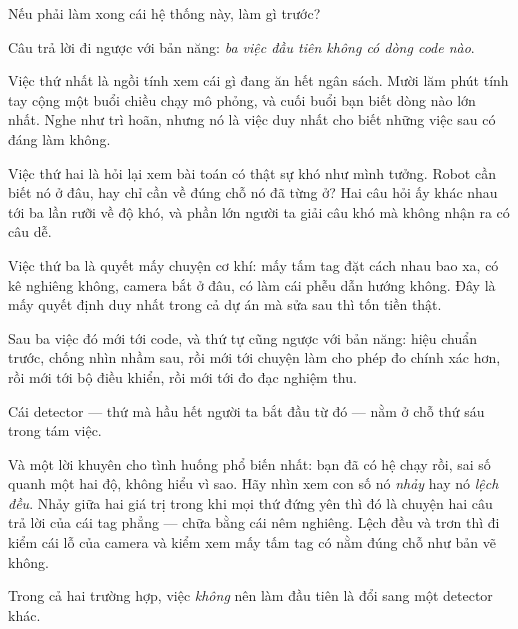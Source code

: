 \documentclass[../../marker.tex]{subfiles}
\begin{document}
\begin{dongian}
Nếu phải làm xong cái hệ thống này, làm gì trước?

Câu trả lời đi ngược với bản năng: \emph{ba việc đầu tiên không có dòng code nào}.

Việc thứ nhất là ngồi tính xem cái gì đang ăn hết ngân sách. Mười lăm phút tính tay cộng một buổi chiều chạy mô phỏng, và cuối buổi bạn biết dòng nào lớn nhất. Nghe như trì hoãn, nhưng nó là việc duy nhất cho biết những việc sau có đáng làm không.

Việc thứ hai là hỏi lại xem bài toán có thật sự khó như mình tưởng. Robot cần biết nó ở đâu, hay chỉ cần về đúng chỗ nó đã từng ở? Hai câu hỏi ấy khác nhau tới ba lần rưỡi về độ khó, và phần lớn người ta giải câu khó mà không nhận ra có câu dễ.

Việc thứ ba là quyết mấy chuyện cơ khí: mấy tấm tag đặt cách nhau bao xa, có kê nghiêng không, camera bắt ở đâu, có làm cái phễu dẫn hướng không. Đây là mấy quyết định duy nhất trong cả dự án mà sửa sau thì tốn tiền thật.

Sau ba việc đó mới tới code, và thứ tự cũng ngược với bản năng: hiệu chuẩn trước, chống nhìn nhầm sau, rồi mới tới chuyện làm cho phép đo chính xác hơn, rồi mới tới bộ điều khiển, rồi mới tới đo đạc nghiệm thu.

Cái detector --- thứ mà hầu hết người ta bắt đầu từ đó --- nằm ở chỗ thứ sáu trong tám việc.

Và một lời khuyên cho tình huống phổ biến nhất: bạn đã có hệ chạy rồi, sai số quanh một hai độ, không hiểu vì sao. Hãy nhìn xem con số nó \emph{nhảy} hay nó \emph{lệch đều}. Nhảy giữa hai giá trị trong khi mọi thứ đứng yên thì đó là chuyện hai câu trả lời của cái tag phẳng --- chữa bằng cái nêm nghiêng. Lệch đều và trơn thì đi kiểm cái lỗ của camera và kiểm xem mấy tấm tag có nằm đúng chỗ như bản vẽ không.

Trong cả hai trường hợp, việc \emph{không} nên làm đầu tiên là đổi sang một detector khác.

\end{dongian}
\end{document}
